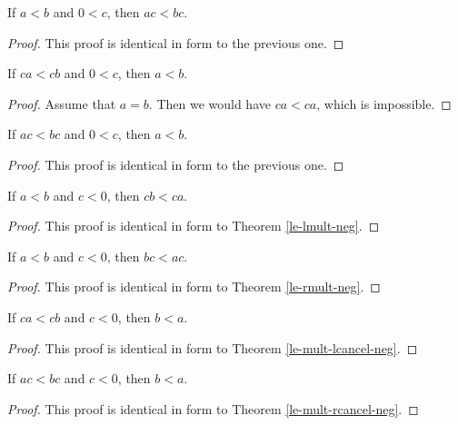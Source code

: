 \documentclass[../math.tex]{subfiles}
\begin{document}
\begin{theorem}
    If $a < b$ and $0 < c$, then $ac < bc$.
\end{theorem}
\begin{proof}
    This proof is identical in form to the previous one.
\end{proof}

\begin{theorem}
    If $ca < cb$ and $0 < c$, then $a < b$.
\end{theorem}
\begin{proof}
    Assume that $a = b$.  Then we would have $ca < ca$, which is impossible.
\end{proof}

\begin{theorem}
    If $ac < bc$ and $0 < c$, then $a < b$.
\end{theorem}
\begin{proof}
    This proof is identical in form to the previous one.
\end{proof}

\begin{theorem}
    If $a < b$ and $c < 0$, then $cb < ca$.
\end{theorem}
\begin{proof}
    This proof is identical in form to Theorem \ref{le-lmult-neg}.
\end{proof}

\begin{theorem}
    If $a < b$ and $c < 0$, then $bc < ac$.
\end{theorem}
\begin{proof}
    This proof is identical in form to Theorem \ref{le-rmult-neg}.
\end{proof}

\begin{theorem}
    If $ca < cb$ and $c < 0$, then $b < a$.
\end{theorem}
\begin{proof}
    This proof is identical in form to Theorem \ref{le-mult-lcancel-neg}.
\end{proof}

\begin{theorem}
    If $ac < bc$ and $c < 0$, then $b < a$.
\end{theorem}
\begin{proof}
    This proof is identical in form to Theorem \ref{le-mult-rcancel-neg}.
\end{proof}
\end{document}
